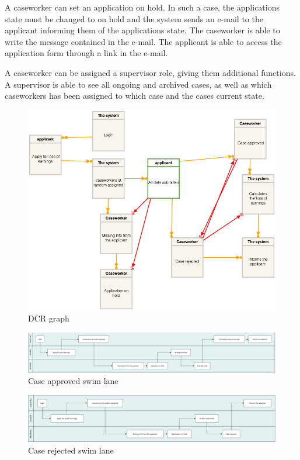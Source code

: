 A caseworker can set an application on hold. In such a case, the applications state must be changed to on hold and the system sends an e-mail to the applicant informing them of the applications state. The caseworker is able to write the message contained in the e-mail. The applicant is able to access the application form through a link in the e-mail.

\vspace{2mm}

A caseworker can be assigned a supervisor role, giving them additional functions. A supervisor is able to see all ongoing and archived cases, as well as which caseworkers has been assigned to which case and the cases current state.
\newpage
\begin{figure}[htb!]
	\includegraphics[width=\textwidth]{img/dcrgraph.png}
	\caption{DCR graph}
\end{figure}

\begin{figure}
    \centering
    \includegraphics{img/swim-case-approved.png}
    \caption{Case approved swim lane}
\end{figure}

\begin{figure}
    \centering
    \includegraphics{img/swim-case-rejected.png}
    \caption{Case rejected swim lane}
\end{figure}